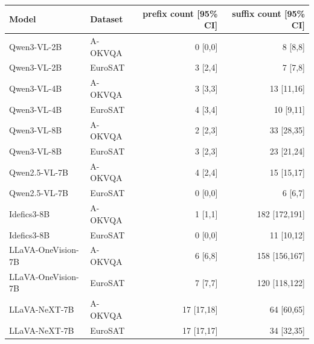 \begin{tabular}{llrr}
\toprule
Model & Dataset & prefix count [95\% CI] & suffix count [95\% CI] \\
\midrule
Qwen3-VL-2B & A-OKVQA & 0 [0,0] & 8 [8,8] \\
Qwen3-VL-2B & EuroSAT & 3 [2,4] & 7 [7,8] \\
Qwen3-VL-4B & A-OKVQA & 3 [3,3] & 13 [11,16] \\
Qwen3-VL-4B & EuroSAT & 4 [3,4] & 10 [9,11] \\
Qwen3-VL-8B & A-OKVQA & 2 [2,3] & 33 [28,35] \\
Qwen3-VL-8B & EuroSAT & 3 [2,3] & 23 [21,24] \\
Qwen2.5-VL-7B & A-OKVQA & 4 [2,4] & 15 [15,17] \\
Qwen2.5-VL-7B & EuroSAT & 0 [0,0] & 6 [6,7] \\
Idefics3-8B & A-OKVQA & 1 [1,1] & 182 [172,191] \\
Idefics3-8B & EuroSAT & 0 [0,0] & 11 [10,12] \\
LLaVA-OneVision-7B & A-OKVQA & 6 [6,8] & 158 [156,167] \\
LLaVA-OneVision-7B & EuroSAT & 7 [7,7] & 120 [118,122] \\
LLaVA-NeXT-7B & A-OKVQA & 17 [17,18] & 64 [60,65] \\
LLaVA-NeXT-7B & EuroSAT & 17 [17,17] & 34 [32,35] \\
\bottomrule
\end{tabular}
